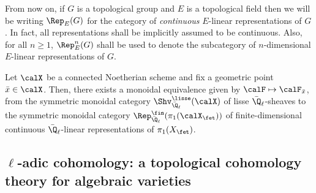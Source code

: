             \begin{convention} \label{conv: continuous_linear_representations}
                From now on, if $G$ is a topological group and $E$ is a topological field then we will be writing $\Rep_E(G)$ for the category of \textit{continuous} $E$-linear representations of $G$. In fact, all representations shall be implicitly assumed to be continuous. Also, for all $n \geq 1$, $\Rep_E^n(G)$ shall be used to denote the subcategory of $n$-dimensional $E$-linear representations of $G$.
            \end{convention}
            \begin{theorem} \label{theorem: galois_representations_are_lisse_sheaves}
                \cite[Theorem 1.4.5.7]{conrad_etale_cohomology} Let $\calX$ be a connected Noetherian scheme and fix a geometric point $\bar{x} \in \calX$. Then, there exists a monoidal equivalence given by $\calF \mapsto \calF_{\bar{x}}$, from the symmetric monoidal category $\Shv_{\bar{\Q}_{\ell}}^{\lisse}(\calX)$ of lisse $\bar{\Q}_{\ell}$-sheaves to the symmetric monoidal category $\Rep_{\bar{\Q}_{\ell}}^{\fin}(\pi_1(\calX_{\fet}))$ of finite-dimensional continuous $\bar{\Q}_{\ell}$-linear representations of $\pi_1(X_{\fet})$.
            \end{theorem}
            
    \subsection{\texorpdfstring{$\ell$}{}-adic cohomology: a topological cohomology theory for algebraic varieties}
            

